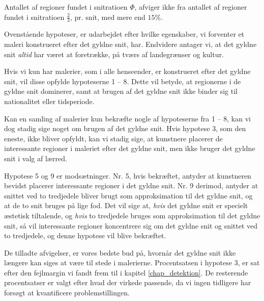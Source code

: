 {\begin{hypotese}
    Antallet af regioner fundet i snitratioen $\varPhi$, afviger ikke
    fra antallet af regioner fundet i snitratioen $\frac{2}{3}$, pr.
    snit, med mere end $15 \%$.
    \label{hypo_15p}
\end{hypotese}

Ovenstående hypoteser, er udarbejdet efter hvilke egenskaber, vi
forventer et maleri konstrueret efter det gyldne snit, har. Endvidere
antager vi, at det gyldne snit \emph{altid} har været at foretrække, på
tværs af landegrænser og kultur.

Hvis vi kun har malerier, som i alle henseender, er konstrueret efter det
gyldne snit, vil disse opfylde hypoteserne 1 -- 8. Dette vil betyde, at
regionerne i de gyldne snit dominerer, samt at brugen af det gyldne snit
ikke binder sig til nationalitet eller tidsperiode.

Kan en samling af malerier kun bekræfte nogle af hypoteserne fra 1 -- 8,
kan vi dog stadig sige noget om brugen af det gyldne snit. Hvis hypotese
3, som den eneste, ikke bliver opfyldt, kan vi stadig sige, at kunstnere
placerer de interessante regioner i maleriet efter det gyldne snit, men
ikke bruger det gyldne snit i valg af lærred.

Hypotese 5 og 9 er modsætninger. Nr. 5, hvis bekræftet, antyder at
kunstneren bevidst placerer interessante regioner i det gyldne snit. Nr.
9 derimod, antyder at snittet ved to tredjedele bliver brugt som
approksimation til det gyldne snit, og at de to snit bruges på lige fod.
Det vil sige at, \emph{hvis} det gyldne snit er specielt æstetisk
tiltalende, og \emph{hvis} to tredjedele bruges som approksimation til
det gyldne snit, så vil interessante regioner koncentrere sig om det
gyldne snit og snittet ved to tredjedele, og denne hypotese vil blive
bekræftet.

De tilladte afvigelser, er vores bedste bud på, hvornår det gyldne snit
ikke længere kan siges at være til stede i malerierne. Procentsatsen i
hypotese 3, er sat efter den fejlmargin vi fandt frem til i kapitel
\ref{chap_detektion}. De resterende procentsatser er valgt efter hvad
der virkede passende, da vi ingen tidligere har forsøgt at kvantificere
problemstillingen.

}
